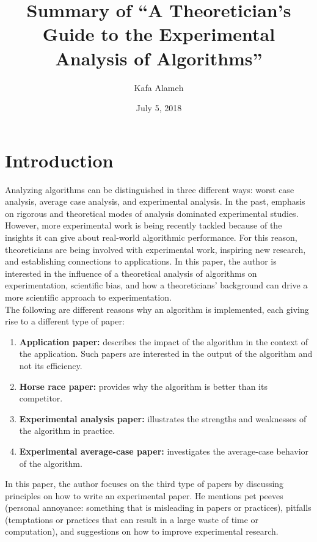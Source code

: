 \documentclass[]{scrartcl}
\title{Summary of ``A Theoretician's Guide to the Experimental Analysis of Algorithms''}
\author{Kafa Alameh}
\date{July 5, 2018}
\begin{document}
\maketitle

\begin{abstract}

\end{abstract}

\section{Introduction}
Analyzing algorithms can be distinguished in three different ways: worst case analysis, average case analysis, and experimental analysis. 
In the past, emphasis on rigorous and theoretical modes of analysis dominated experimental studies. However, more experimental work is being recently tackled because of the insights it can give about real-world algorithmic performance. For this reason, theoreticians are being involved with experimental work, inspiring new research, and establishing connections to applications. In this paper, the author is interested in the influence of a theoretical analysis of algorithms on experimentation, scientific bias, and how a theoreticians’ background can drive a more scientific approach to experimentation. \\ The following are different reasons why an algorithm is implemented, each giving rise to a different type of paper: 
\begin{enumerate}
	\item \textbf{Application paper:} describes the impact of the algorithm in the context of the application. Such papers are interested in the output of the algorithm and not its efficiency.
	\item \textbf{Horse race paper:} provides why the algorithm is better than its competitor.
	\item \textbf{Experimental analysis paper:} illustrates the strengths and weaknesses of the algorithm in practice.
	\item \textbf{Experimental average-case paper:} investigates the average-case behavior of the algorithm. 
\end{enumerate}
In this paper, the author focuses on the third type of papers by discussing principles on how to write an experimental paper. He mentions pet peeves (personal annoyance: something that is misleading in papers or practices), pitfalls (temptations or practices that can result in a large waste of time or computation), and suggestions on how to improve experimental research.
\end{document}

